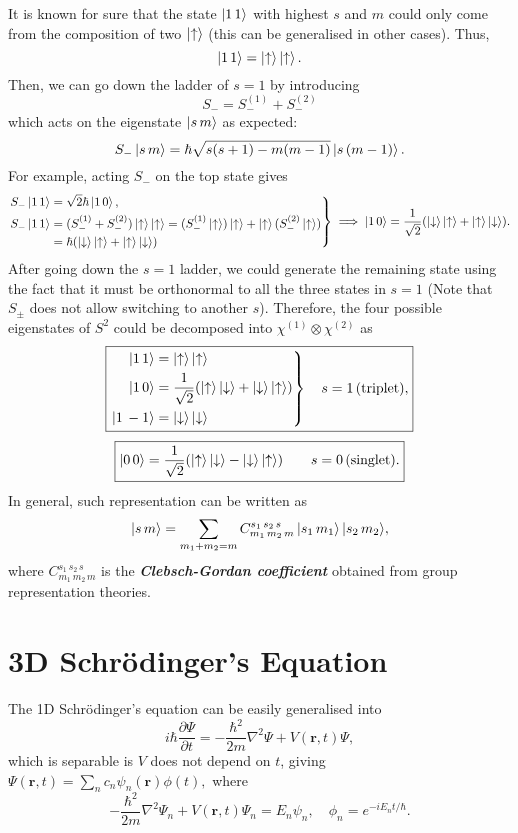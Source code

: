 \documentclass{article}
\newcommand{\up}{\ket{\uparrow}} %
\newcommand{\dn}{\ket{\downarrow}} %
\theoremstyle{nonumberplain}
\begin{document}
It is known for sure that the state $\ket{1 \, 1}$ with highest $s$ and $m$ could only come from the composition of two $\up$ (this can be generalised in other cases). Thus, 
\[
    \ket{1 \, 1} = \up \up. 
\]
Then, we can go down the ladder of $s = 1$ by introducing 
\[
    S_- = S_-^{(1)} + S_-^{(2)}
\]
which acts on the eigenstate $\ket{s \, m}$ as expected:
\[
    S_- \ket{s \, m} = \hbar  \sqrt{s(s+1) - m(m-1)} \ket{s \, (m-1)}.  
\]
For example, acting $S_-$ on the top state gives 
\[
    \left. 
    \begin{aligned}
        S_- \ket{1 \, 1} &= \sqrt{2} \hbar \ket{1 \, 0}, \\
        S_- \ket{1 \, 1} &= (S_-^{(1)} + S_-^{(2)}) \up \up =  (S_-^{(1)} \up ) \up + \up (S_-^{(2)} \up) \\
        &= \hbar (\dn \up + \up \dn)
    \end{aligned}
    \right\}\implies 
    \ket{1 \, 0 } = \frac{1}{\sqrt{2} } (\dn \up + \up \dn). 
\]
After going down the $s=1$ ladder, we could generate the remaining state using the fact that it must be orthonormal to all the three states in $s=1$ (Note that $S_{\pm}$ does not allow switching to another $s$). Therefore, the four possible eigenstates of $S^2$ could be decomposed into $\chi^{(1)} \otimes \chi^{(2)}$ as 
\[ \boxed{
        \left. 
            \begin{aligned}
                \ket{1 \, 1} &= \up \up \\ 
                \ket{1 \, 0} &= \frac{1}{\sqrt{2} } (\up \dn + \dn \up ) \\
                \ket{1 \, -1} &= \dn \dn  
            \end{aligned}                \right\} \quad s=1 \, (\text{triplet}), }
\]
\[\boxed{
    \ket{0 \, 0} = \frac{1}{\sqrt{2} } ( \up \dn - \dn \up ) \qquad s=0 \, (\text{singlet}).}
\]
In general, such representation can be written as 
\[
    \ket{s \, m} = \sum\limits_{m_1 + m_2=m} {C_{m_1 \, m_2 \, m}^{s_1 \, s_2 \, s} \ket{s_1 \, m_1} \ket{s_2 \, m_2}} ,
\]
where $C_{m_1 \, m_2 \, m}^{s_1 \, s_2 \, s}$ is the \textit{\textbf{Clebsch-Gordan coefficient}} obtained from group representation theories. 
\section{3D Schrödinger's Equation}
The 1D Schrödinger's equation can be easily generalised into 
\begin{equation} \label{eq:3D-SE}
    i \hbar \frac{\partial \Psi }{\partial t}  = 
    -\frac{\hbar^{2}}{2 m } \nabla ^2 \Psi  + V(\mathbf{r},t) \Psi, 
\end{equation}
which is separable is $V$ does not depend on $t$, giving $\Psi (\mathbf{r} ,t) = \sum_{n} c_n \psi_n (\mathbf{r} ) \phi(t),$ where 
\begin{equation}
    \label{eq:3D-SE-TI}
    -\frac{\hbar^{2}}{2 m } \nabla ^2 \Psi_n  + V(\mathbf{r},t) \Psi_n = E_n \psi_n, \quad 
    \phi_n = e^{-i E_n t/ \hbar }. 
\end{equation}
\end{document}
